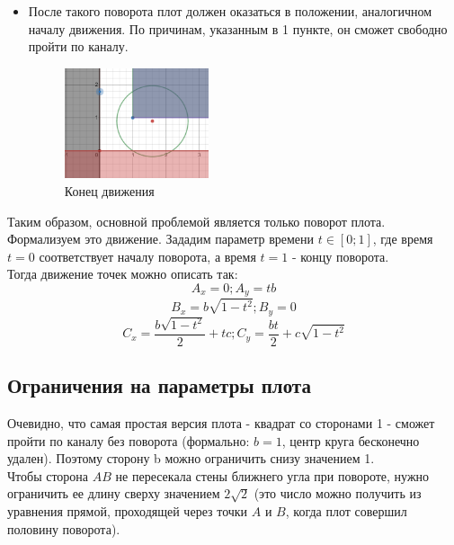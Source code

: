 \begin{itemize}
\newpage

\item После такого поворота плот должен оказаться в положении, аналогичном началу движения. По причинам, указанным в 1 пункте, он сможет свободно пройти по каналу.
\begin{figure}[!htb]
    \centering
    \includegraphics[width=0.4\textwidth]{fig/sofa3.png}
    \caption{Конец движения}
\end{figure}

\end{itemize}

Таким образом, основной проблемой является только поворот плота. Формализуем это движение. Зададим параметр времени $t \in [0;1]$, где время $t=0$ соответствует началу поворота, а время $t=1$ - концу поворота. \\

Тогда движение точек можно описать так:
\begin{equation}
A_x = 0; A_y=tb
\end{equation}
\begin{equation}
B_x = b\sqrt{1-t^2}; B_y=0
\end{equation}
\begin{equation}
C_x = \frac{b\sqrt{1-t^2}}{2}+tc; C_y=\frac{bt}{2}+c\sqrt{1-t^2}
\end{equation}


\subsection{Ограничения на параметры плота}
Очевидно, что самая простая версия плота - квадрат со сторонами 1 - сможет пройти по каналу без поворота (формально: $b=1$, центр круга бесконечно удален). Поэтому сторону b можно ограничить снизу значением 1. \\

Чтобы сторона $AB$ не пересекала стены ближнего угла при повороте, нужно ограничить ее длину сверху значением $2\sqrt{2}$ (это число можно получить из уравнения прямой, проходящей через точки $A$ и $B$, когда плот совершил половину поворота). \\

